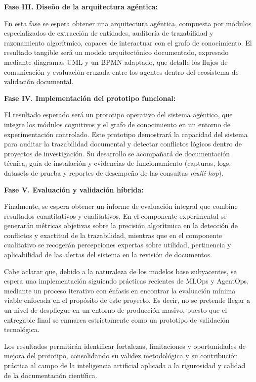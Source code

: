 \documentclass[12pt,letterpaper]{article}
\begin{document}
\textbf{Fase III. Diseño de la arquitectura agéntica:}

En esta fase se espera obtener una arquitectura agéntica, compuesta por módulos especializados de extracción de entidades, auditoría de trazabilidad y razonamiento algorítmico, capaces de interactuar con el grafo de conocimiento. El resultado tangible será un modelo arquitectónico documentado, expresado mediante diagramas UML y un BPMN adaptado, que detalle los flujos de comunicación y evaluación cruzada entre los agentes dentro del ecosistema de validación documental.

\newpage
\textbf{Fase IV. Implementación del prototipo funcional:}

El resultado esperado será un prototipo operativo del sistema agéntico, que integre los módulos cognitivos y el grafo de conocimiento en un entorno de experimentación controlado. Este prototipo demostrará la capacidad del sistema para auditar la trazabilidad documental y detectar conflictos lógicos dentro de proyectos de investigación. Su desarrollo se acompañará de documentación técnica, guía de instalación y evidencias de funcionamiento (capturas, logs, datasets de prueba y reportes de desempeño de las consultas \textit{multi-hop}).

\textbf{Fase V. Evaluación y validación híbrida:}

Finalmente, se espera obtener un informe de evaluación integral que combine resultados cuantitativos y cualitativos. En el componente experimental se generarán métricas objetivas sobre la precisión algorítmica en la detección de conflictos y exactitud de la trazabilidad, mientras que en el componente cualitativo se recogerán percepciones expertas sobre utilidad, pertinencia y aplicabilidad de las alertas del sistema en la revisión de documentos. 

Cabe aclarar que, debido a la naturaleza de los modelos base subyacentes, se espera una implementación siguiendo prácticas recientes de MLOps y AgentOps, mediante un proceso iterativo con énfasis en encontrar la evaluación mínima viable enfocada en el propósito de este proyecto. Es decir, no se pretende llegar a un nivel de despliegue en un entorno de producción masivo, puesto que el entregable final se enmarca estrictamente como un prototipo de validación tecnológica.

Los resultados permitirán identificar fortalezas, limitaciones y oportunidades de mejora del prototipo, consolidando su validez metodológica y su contribución práctica al campo de la inteligencia artificial aplicada a la rigurosidad y calidad de la documentación científica.
\end{document}
